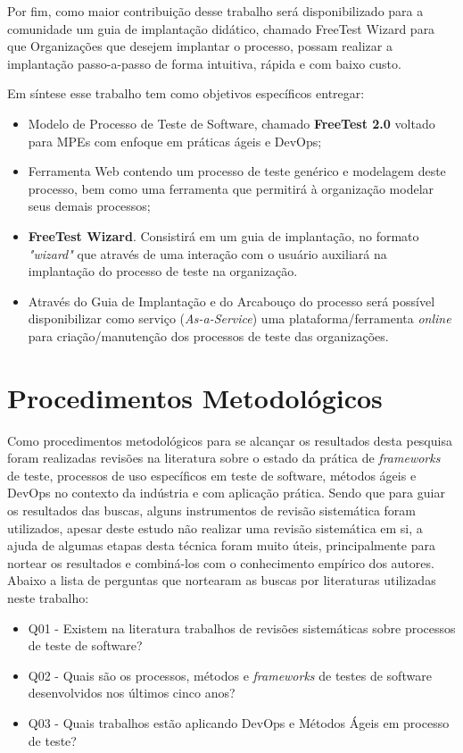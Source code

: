 Por fim, como maior contribuição desse trabalho será disponibilizado para a comunidade um guia de implantação didático, chamado FreeTest Wizard para que Organizações que desejem implantar o processo, possam realizar a implantação passo-a-passo de forma intuitiva, rápida e com baixo custo. 

Em síntese esse trabalho tem como objetivos específicos entregar:

\begin{itemize}
    \item Modelo de Processo de Teste de Software, chamado \textbf{FreeTest 2.0} voltado para MPEs com enfoque em práticas ágeis e DevOps;
    \item Ferramenta Web contendo um processo de teste genérico e modelagem deste processo, bem como uma ferramenta que permitirá à organização modelar seus demais processos;
    \item \textbf{FreeTest Wizard}. Consistirá em um guia de implantação, no formato \textit{"\textit{wizard}"} que através de uma interação com o usuário auxiliará na implantação do processo de teste na organização. 
    \item Através do Guia de Implantação e do Arcabouço do processo será possível disponibilizar como serviço (\textit{As-a-Service}) uma plataforma/ferramenta \textit{online} para criação/manutenção dos processos de teste das organizações.
\end{itemize}

\section{Procedimentos Metodológicos}
\label{sec:procedimentos}

Como procedimentos metodológicos para se alcançar os resultados desta pesquisa foram realizadas revisões na literatura sobre o estado da prática de \textit{frameworks} de teste, processos de uso específicos em teste de software, métodos ágeis e DevOps no contexto da indústria e com aplicação prática. Sendo que para guiar os resultados das buscas, alguns instrumentos de revisão sistemática foram utilizados, apesar deste estudo não realizar uma revisão sistemática em si, a ajuda de algumas etapas desta técnica foram muito úteis, principalmente para nortear os resultados e combiná-los com o conhecimento empírico dos autores. Abaixo a lista de perguntas que nortearam as buscas por literaturas utilizadas neste trabalho:

\begin{itemize}
    \item Q01 - Existem na literatura trabalhos de revisões sistemáticas sobre processos de teste de software?
    \item Q02 - Quais são os processos, métodos e \textit{frameworks} de testes de software desenvolvidos nos últimos cinco anos?
    \item Q03 - Quais trabalhos estão aplicando DevOps e Métodos Ágeis em processo de teste?
\end{itemize}

